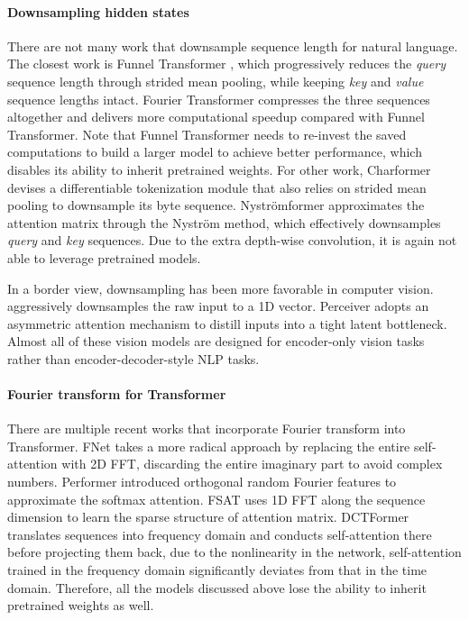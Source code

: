 \documentclass[11pt]{article}
\begin{document}
\paragraph{Downsampling hidden states} There are not many work that downsample sequence length for natural language. The closest work is Funnel Transformer \citep{dai2020funnel}, which progressively reduces the \textit{query} sequence length through strided mean pooling, while keeping \textit{key} and \textit{value} sequence lengths intact. Fourier Transformer compresses the three sequences altogether and delivers more computational speedup compared with Funnel Transformer. Note that Funnel Transformer needs to re-invest the saved computations to build a larger model to achieve better performance, which disables its ability to inherit pretrained weights. For other work, Charformer \citep{tay2021charformer} devises a differentiable tokenization module that also relies on strided mean pooling to downsample its byte sequence. Nystr\"{o}mformer \citep{xiong2021nystromformer} approximates the attention matrix through the Nystr\"{o}m method, which effectively downsamples \textit{query} and \textit{key} sequences. Due to the extra depth-wise convolution, it is again not able to leverage pretrained models. 

In a border view, downsampling has been more favorable in computer vision. \citep{chen2020generative} aggressively downsamples the raw input to a 1D vector. Perceiver \citep{jaegle2021perceiver} adopts an asymmetric attention mechanism to distill inputs into a tight latent bottleneck. Almost all of these vision models are designed for encoder-only vision tasks rather than encoder-decoder-style NLP tasks. 

\paragraph{Fourier transform for Transformer}
There are multiple recent works that incorporate Fourier transform into Transformer. FNet \citep{lee2021fnet} takes a more radical approach by replacing the entire self-attention with 2D FFT, discarding the entire imaginary part to avoid complex numbers. Performer \citep{choromanski2020masked} introduced orthogonal random Fourier features to approximate the softmax attention. FSAT \citep{zhuang2022long} uses 1D FFT along the sequence dimension to learn the sparse structure of attention matrix. DCTFormer \citep{scribano2022dct} translates sequences into frequency domain and conducts self-attention there before projecting them back, due to the nonlinearity in the network, self-attention trained in the frequency domain significantly deviates from that in the time domain. Therefore, all the models discussed above lose the ability to inherit pretrained weights as well.
\end{document}
